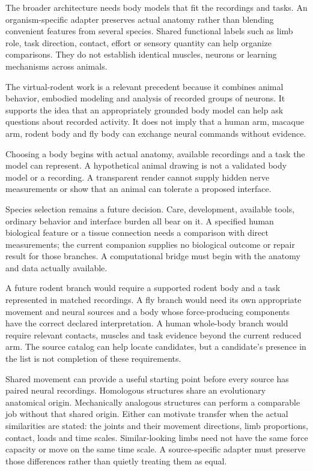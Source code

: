 The broader architecture needs body models that fit the recordings and tasks. An organism-specific adapter preserves actual anatomy rather than blending convenient features from several species. Shared functional labels such as limb role, task direction, contact, effort or sensory quantity can help organize comparisons. They do not establish identical muscles, neurons or learning mechanisms across animals.

The virtual-rodent work is a relevant precedent because it combines animal behavior, embodied modeling and analysis of recorded groups of neurons. It supports the idea that an appropriately grounded body model can help ask questions about recorded activity. It does not imply that a human arm, macaque arm, rodent body and fly body can exchange neural commands without evidence.\cite{virtualrodent2024}

Choosing a body begins with actual anatomy, available recordings and a task the model can represent. A hypothetical animal drawing is not a validated body model or a recording. A transparent render cannot supply hidden nerve measurements or show that an animal can tolerate a proposed interface.

Species selection remains a future decision. Care, development, available tools, ordinary behavior and interface burden all bear on it. A specified human biological feature or a tissue connection needs a comparison with direct measurements; the current companion supplies no biological outcome or repair result for those branches. A computational bridge must begin with the anatomy and data actually available.

A future rodent branch would require a supported rodent body and a task represented in matched recordings. A fly branch would need its own appropriate movement and neural sources and a body whose force-producing components have the correct declared interpretation. A human whole-body branch would require relevant contacts, muscles and task evidence beyond the current reduced arm. The source catalog can help locate candidates, but a candidate's presence in the list is not completion of these requirements.

Shared movement can provide a useful starting point before every source has
paired neural recordings. Homologous structures share an evolutionary anatomical
origin. Mechanically analogous structures can perform a comparable job without
that shared origin. Either can motivate transfer when the actual similarities
are stated: the joints and their movement directions, limb proportions, contact,
loads and time scales. Similar-looking limbs need not have the same force
capacity or move on the same time scale. A source-specific adapter must preserve
those differences rather than quietly treating them as equal.

